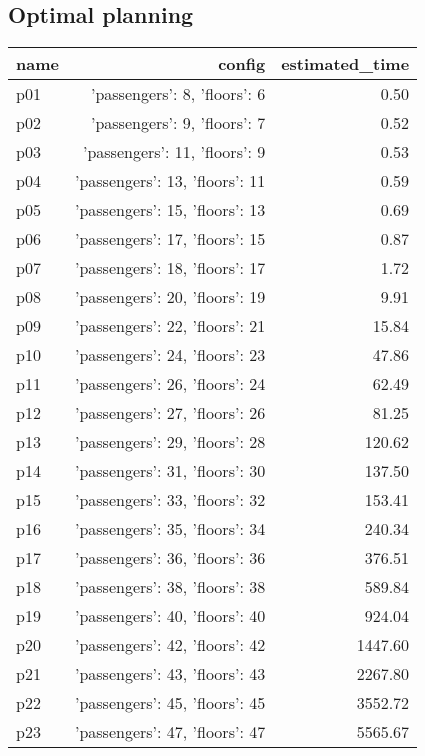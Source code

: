 \documentclass{article}
\begin{document}
                                \subsection*{Optimal planning}
                                
                            \begin{center}
                            \scriptsize
                            \begin{tabular}{@{}l|r|r@{}}
                            name & config & estimated\_time\\\midrule
                              p01&{'passengers': 8, 'floors': 6}&0.50\\
  p02&{'passengers': 9, 'floors': 7}&0.52\\
  p03&{'passengers': 11, 'floors': 9}&0.53\\
  p04&{'passengers': 13, 'floors': 11}&0.59\\
  p05&{'passengers': 15, 'floors': 13}&0.69\\
  p06&{'passengers': 17, 'floors': 15}&0.87\\
  p07&{'passengers': 18, 'floors': 17}&1.72\\
  p08&{'passengers': 20, 'floors': 19}&9.91\\
  p09&{'passengers': 22, 'floors': 21}&15.84\\
  p10&{'passengers': 24, 'floors': 23}&47.86\\
  p11&{'passengers': 26, 'floors': 24}&62.49\\
  p12&{'passengers': 27, 'floors': 26}&81.25\\
  p13&{'passengers': 29, 'floors': 28}&120.62\\
  p14&{'passengers': 31, 'floors': 30}&137.50\\
  p15&{'passengers': 33, 'floors': 32}&153.41\\
  p16&{'passengers': 35, 'floors': 34}&240.34\\
  p17&{'passengers': 36, 'floors': 36}&376.51\\
  p18&{'passengers': 38, 'floors': 38}&589.84\\
  p19&{'passengers': 40, 'floors': 40}&924.04\\
  p20&{'passengers': 42, 'floors': 42}&1447.60\\
  p21&{'passengers': 43, 'floors': 43}&2267.80\\
  p22&{'passengers': 45, 'floors': 45}&3552.72\\
  p23&{'passengers': 47, 'floors': 47}&5565.67\\

\end{tabular}
\end{center}
\end{document}
